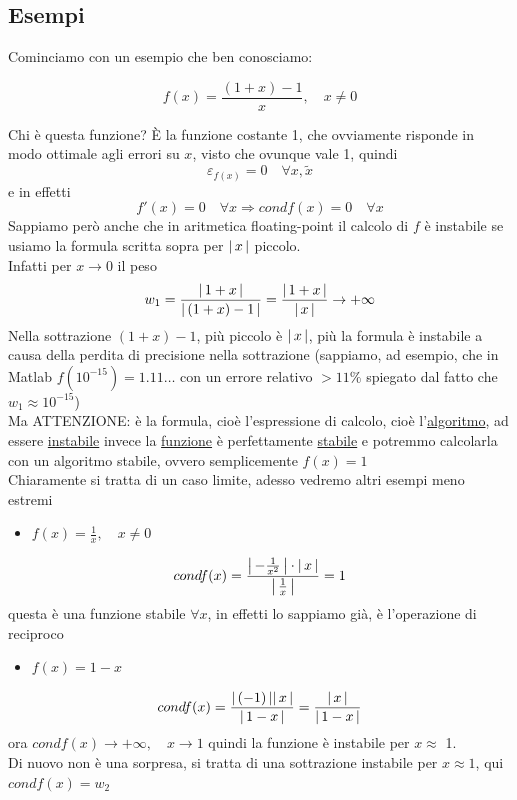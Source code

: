 \subsection{Esempi}
Cominciamo con un esempio che ben conosciamo: \newline
\begin{esempio}
\[ f(x)=\frac{(1+x)-1}{x}, \quad x \neq 0 \] \end{esempio}
Chi è questa funzione? È la funzione costante 1, che ovviamente risponde in modo ottimale agli errori su $x$, visto che ovunque vale 1, quindi \[\varepsilon_{f(x)}=0 \quad \forall x,\tilde{x}\] 
e in effetti \[f'(x)=0 \quad \forall x \Rightarrow cond f(x)=0 \quad \forall x\]
Sappiamo però anche che in aritmetica floating-point il calcolo di $f$ è instabile se usiamo la formula scritta sopra per $\abs{\,x\,}$ piccolo.\\
Infatti per $x\rightarrow 0$ il peso
\[ w_1=\frac{\abs{\,1+x\,}}{\abs{\,(1+x)-1\,}}=\frac{\abs{\,1+x\,}}{\abs{\,x\,}}\rightarrow +\infty \] \newline \newline
Nella sottrazione $(1+x)-1$, più piccolo è $\abs{\,x\,}$, più la formula è instabile a causa della perdita di precisione nella sottrazione
(sappiamo, ad esempio, che in Matlab $f(10^{-15})=1.11 \dotsc$ con un errore relativo $>11\%$ spiegato dal fatto che $w_1\approx 10^{-15}$)\\
Ma ATTENZIONE: è la formula, cioè l'espressione di calcolo, cioè l'\uline{algoritmo}, ad essere \uline{instabile} invece la \uline{funzione} è perfettamente \uline{stabile} e potremmo calcolarla con un algoritmo stabile, ovvero semplicemente $f(x)=1$\\
Chiaramente si tratta di un caso limite, adesso vedremo altri esempi meno estremi
\begin{itemize} %
    \item $f(x)=\frac{1}{x},\quad x\neq 0$
\end{itemize}
\[cond f(x)= \frac{\abs*{\,-\frac{1}{x^2}\,} \cdot \abs{\,x\,}}{\abs*{\,\frac{1}{x}\,}} = 1 \]
questa è una funzione stabile $\forall x$, in effetti lo sappiamo già, è l'operazione di reciproco \newline

\begin{itemize} %
    \item $f(x)=1-x$
\end{itemize}
\[ cond f(x)= \frac{\abs{\,(-1)\,}\abs{\,x\,}}{\abs{\,1-x\,}} = \frac{\abs{\,x\,}}{\abs{\,1-x\,}} \] 
ora $cond f(x)\rightarrow +\infty, \quad x\rightarrow 1$ quindi la funzione è instabile per $x\approx$ 1.\\
Di nuovo non è una sorpresa, si tratta di una sottrazione instabile per $x\approx1$, qui $condf(x)=w_2$ \newline

